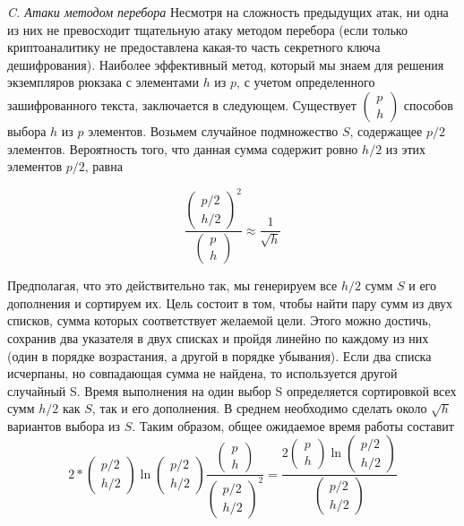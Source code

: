 \documentclass[a4paper,12pt]{article}
\begin{document}
\textsl{C. Атаки методом перебора} \newline
\indent 
Несмотря на сложность предыдущих атак, ни одна из них не превосходит тщательную атаку методом перебора (если только криптоаналитику не предоставлена какая-то часть секретного ключа дешифрования). Наиболее эффективный метод, который мы знаем для решения экземпляров рюкзака с элементами $h$ из $p$, с учетом определенного зашифрованного текста, заключается в следующем. Существует $\begin{pmatrix}p\\h\end{pmatrix}$ способов выбора $h$ из $p$ элементов. Возьмем случайное подмножество $S$, содержащее $p/2$ элементов. Вероятность того, что данная сумма содержит ровно $h /2$ из этих элементов $p /2$, равна 

$$ \frac{\begin{pmatrix}p/2\\h/2\end{pmatrix}^2}{\begin{pmatrix}p\\h\end{pmatrix}} \approx \frac{1}{\sqrt{h}} $$

Предполагая, что это действительно так, мы генерируем все $h/2$ сумм $S$ и его дополнения и сортируем их. Цель состоит в том, чтобы найти пару сумм из двух списков, сумма которых соответствует желаемой цели. Этого можно достичь, сохранив два указателя в двух списках и пройдя линейно по каждому из них (один в порядке возрастания, а другой в порядке убывания). Если два списка исчерпаны, но совпадающая сумма не найдена, то используется другой случайный S. Время выполнения на один выбор S определяется сортировкой всех сумм $h/2$ как $S$, так и его дополнения. В среднем необходимо сделать около $\sqrt{h}$ вариантов выбора из $S$. Таким образом, общее ожидаемое время работы составит
$$ 2 * \begin{pmatrix}p/2\\h/2\end{pmatrix} \ln \begin{pmatrix}p/2\\h/2\end{pmatrix} \frac{\begin{pmatrix}p\\h\end{pmatrix}}{\begin{pmatrix}p/2\\h/2\end{pmatrix}^2} = \frac{2\begin{pmatrix}p\\h\end{pmatrix} \ln \begin{pmatrix}p/2\\h/2\end{pmatrix}}{\begin{pmatrix}p/2\\h/2\end{pmatrix}} $$
\end{document}
